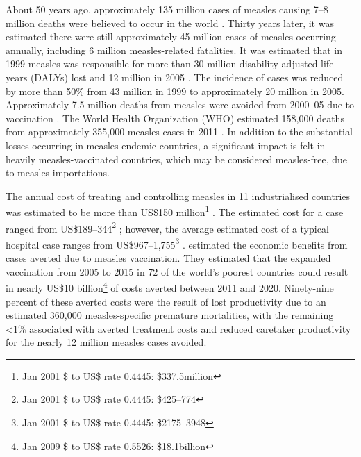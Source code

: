 \documentclass{article}
\begin{document}
About 50 years ago, approximately 135 million cases of measles causing 7--8 million deaths were believed to occur in the world \citep{clements4}. Thirty years later, it was estimated there were still approximately 45 million cases of measles occurring annually, including 6 million measles-related fatalities. It was estimated that in 1999 measles was responsible for more than 30 million disability adjusted life years (DALYs) lost and 12 million in 2005 \citep{wolfson7}. The incidence of cases was reduced by more than 50\% from 43 million in 1999 to approximately 20 million in 2005. Approximately 7.5 million deaths from measles were avoided from 2000--05 due to vaccination \citep{wolfson7}. The World Health Organization (WHO) estimated 158,000 deaths from approximately 355,000 measles cases in 2011 \citep{who13}.  In addition to the substantial losses occurring in measles-endemic countries, a significant impact is felt in heavily measles-vaccinated countries, which may be considered measles-free, due to measles importations.

The annual cost of treating and controlling measles in 11 industrialised countries was estimated to be more than US\$150 million\footnote{Jan 2001 \$ to US\$ rate 0.4445: \$337.5million} \citep{carabin3}. The estimated cost for a case ranged from US\$189--344\footnote{Jan 2001 \$ to US\$ rate 0.4445: \$425--774} \citep{carabin3}; however, the average estimated cost of a typical hospital case ranges from US\$967--1,755\footnote{Jan 2001 \$ to US\$ rate 0.4445: \$2175--3948} \citep{carabin2}. \citet{stack11} estimated the economic benefits from cases averted due to measles vaccination. They estimated that the expanded vaccination from 2005 to 2015 in 72 of the world's poorest countries could result in nearly US\$10 billion\footnote{Jan 2009 \$ to US\$ rate 0.5526: \$18.1billion} of costs averted between 2011 and 2020. Ninety-nine percent of these averted costs were the result of lost productivity due to an estimated 360,000 measles-specific premature mortalities, with the remaining <1\% associated with averted treatment costs and reduced caretaker productivity for the nearly 12 million measles cases avoided.
\end{document}
